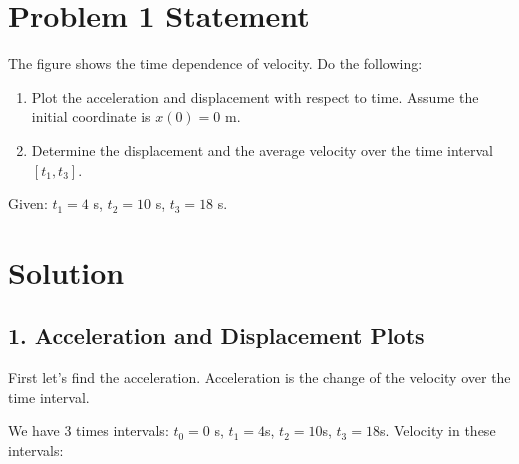 \documentclass{article}
\begin{document}


\section*{Problem 1 Statement}
The figure shows the time dependence of velocity. Do the following:

\begin{enumerate}
    \item Plot the acceleration and displacement with respect to time. Assume the initial coordinate is $x(0) = 0$ m.
    \item Determine the displacement and the average velocity over the time interval $[t_1, t_3]$.
\end{enumerate}

Given: $t_1 = 4$ s, $t_2 = 10$ s, $t_3 = 18$ s.

\section*{Solution}

\subsection*{1. Acceleration and Displacement Plots}
First let's find the acceleration. Acceleration is the change of the velocity over the time interval.

We have 3 times intervals: $t_0 = 0$ s, $t_1 = 4$s, $t_2 = 10$s, $t_3 = 18$s.
\bigbreak
Velocity in these intervals: 
\end{document}
